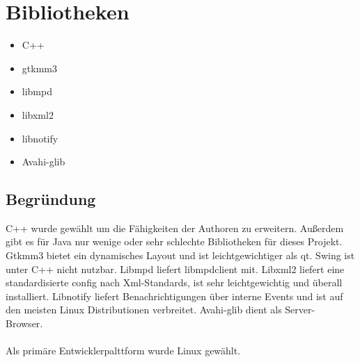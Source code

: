\section{Bibliotheken}
\begin{itemize}
\item C++
\item gtkmm3
\item libmpd
\item libxml2
\item libnotify
\item Avahi-glib
\end{itemize}
\subsection{Begründung}
C++ wurde gewählt um die Fähigkeiten der Authoren zu erweitern. Außerdem gibt es für Java nur wenige
oder sehr schlechte Bibliotheken für dieses Projekt. Gtkmm3 bietet ein dynamisches Layout und ist
leichtgewichtiger als qt. Swing ist unter C++ nicht nutzbar. Libmpd liefert libmpdclient mit.
Libxml2 liefert eine standardisierte config nach Xml-Standards, ist sehr leichtgewichtig und überall
installiert. Libnotify liefert Benachrichtigungen über interne Events und ist auf den meisten Linux
Distributionen verbreitet. Avahi-glib dient als Server-Browser.\ \\ \\
Als primäre Entwicklerpalttform wurde Linux gewählt.
